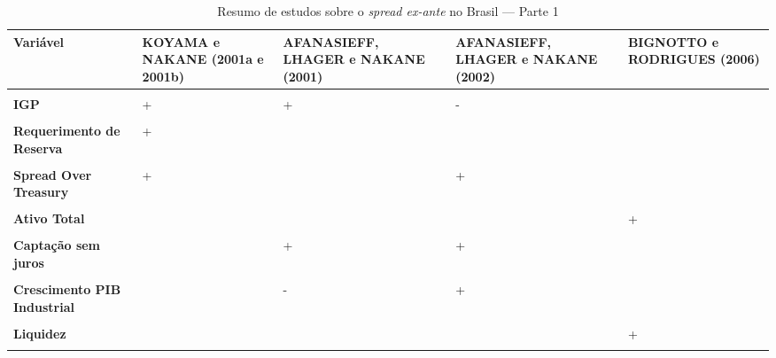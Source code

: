 \documentclass[12pt,12pt,openright,oneside,a4paper,chapter=TITLE,section=TITLE,subsection=TITLE,subsubsection=TITLE,english,french,spanish,portugues,sumario=tradicional]{abntex2}
\begin{document}
\begin{table}
\caption{Resumo de estudos sobre o \emph{spread ex-ante} no Brasil — Parte 1}
\begingroup\fontsize{10}{12}\selectfont

\begin{tabu} to 
\toprule
Variável & KOYAMA e NAKANE (2001a e 2001b) & AFANASIEFF, LHAGER e NAKANE (2001) & AFANASIEFF, LHAGER e NAKANE (2002) & BIGNOTTO e RODRIGUES (2006)\\
\midrule
\textbf{} &  &  &  & \\
\textbf{IGP} & + & + & - & \\
\textbf{} &  &  &  & \\
\textbf{Requerimento de Reserva} & + &  &  & \\
\textbf{} &  &  &  & \\
\addlinespace
\textbf{Spread Over Treasury} & + &  & + & \\
\textbf{} &  &  &  & \\
\textbf{Ativo Total} &  &  &  & +\\
\textbf{} &  &  &  & \\
\textbf{Captação sem juros} &  & + & + & \\
\addlinespace
\textbf{} &  &  &  & \\
\textbf{Crescimento PIB Industrial} &  & - & + & \\
\textbf{} &  &  &  & \\
\textbf{Liquidez} &  &  &  & +\\
\textbf{} &  &  &  & \\

\end{tabu}
\end{table}
\end{document}
